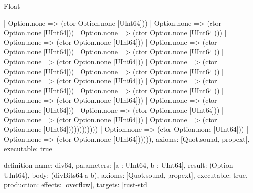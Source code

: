 \begin{lexlean}{Float}
\begin{semanticmodule}
{                                        | Option.none => (ctor Option.none [UInt64]))
                                      | Option.none => (ctor Option.none [UInt64]))
                                    | Option.none => (ctor Option.none [UInt64])))
                                  | Option.none => (ctor Option.none [UInt64]))
                                | Option.none => (ctor Option.none [UInt64]))
                              | Option.none => (ctor Option.none [UInt64]))
                            | Option.none => (ctor Option.none [UInt64]))
                          | Option.none => (ctor Option.none [UInt64]))
                        | Option.none => (ctor Option.none [UInt64]))
                      | Option.none => (ctor Option.none [UInt64]))
                    | Option.none => (ctor Option.none [UInt64]))
                  | Option.none => (ctor Option.none [UInt64]))
                | Option.none => (ctor Option.none [UInt64]))
              | Option.none => (ctor Option.none [UInt64]))
            | Option.none => (ctor Option.none [UInt64]))
          | Option.none => (ctor Option.none [UInt64]))
        | Option.none => (ctor Option.none [UInt64])))))))))))
      | Option.none => (ctor Option.none [UInt64]))
    | Option.none => (ctor Option.none [UInt64]))))),
  axioms: [Quot.sound, propext],
  executable: true
}

definition{
  name: div64,
  parameters: [a : UInt64, b : UInt64],
  result: (Option UInt64),
  body: (divBits64 a b),
  axioms: [Quot.sound, propext],
  executable: true,
  production: {effects: [overflow], targets: [rust-std]}
}
\end{semanticmodule}
\end{lexlean}
